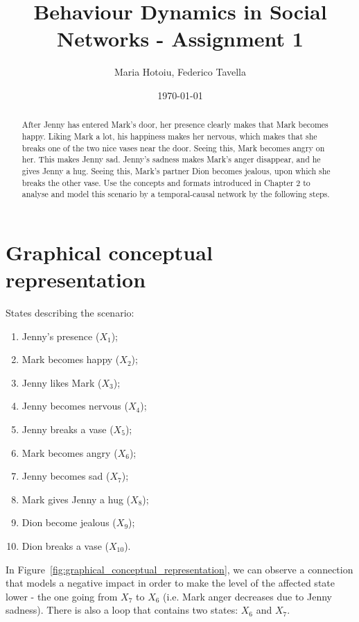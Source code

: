 \documentclass[a4paper]{article}
\title{Behaviour Dynamics in Social Networks - Assignment 1}
\author{Maria Hotoiu, Federico Tavella}
\date{\today}
\begin{document}
\maketitle

\begin{abstract}
After Jenny has entered Mark’s door, her presence clearly makes that Mark becomes happy. Liking Mark a lot, his happiness makes her nervous, which makes that she breaks one of the two nice vases near the door. Seeing this, Mark becomes angry on her. This makes Jenny sad. Jenny’s sadness makes Mark’s anger disappear, and he gives Jenny a hug. Seeing this, Mark’s partner Dion becomes jealous, upon which she breaks the other vase.
\newline
Use the concepts and formats introduced in Chapter 2 to analyse and model this scenario by a temporal-causal network by the following steps.
\end{abstract}

\section{Graphical conceptual representation}
\label{sec:graphical_conceptual_representation}

States describing the scenario:

\begin{enumerate}
\item Jenny's presence ($X_1$);
\item Mark becomes happy ($X_2$);
\item Jenny likes Mark ($X_3$);
\item Jenny becomes nervous ($X_4$);
\item Jenny breaks a vase ($X_5$);
\item Mark becomes angry ($X_6$);
\item Jenny becomes sad ($X_7$);
\item Mark gives Jenny a hug ($X_8$);
\item Dion become jealous ($X_9$);
\item Dion breaks a vase ($X_10$).
\end{enumerate}

In Figure~\ref{fig:graphical_conceptual_representation}, we can observe a connection that models a negative impact in order to make the level of the affected state lower - the one going from $X_7$ to $X_6$ (i.e. Mark anger decreases due to Jenny sadness). There is also a loop that contains two states: $X_6$ and $X_7$.
\end{document}

